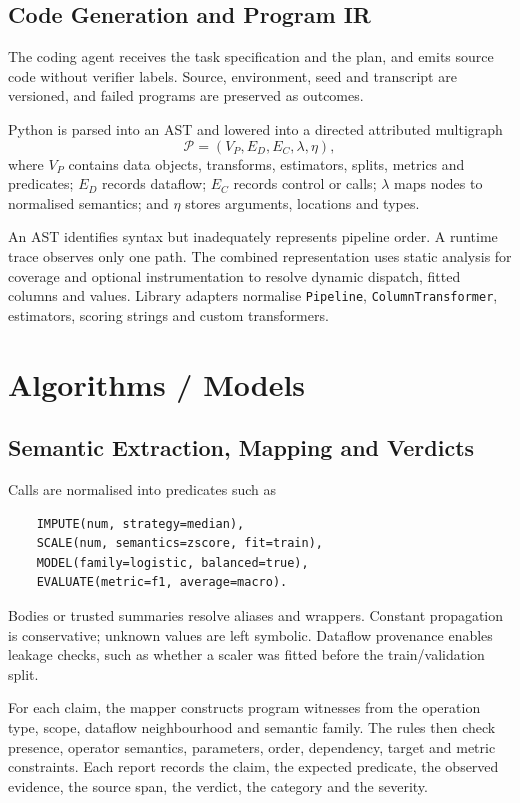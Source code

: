 \subsection{Code Generation and Program IR}

The coding agent receives the task specification and the plan, and
emits source code without verifier labels. Source, environment, seed
and transcript are versioned, and failed programs are preserved as
outcomes.

Python is parsed into an AST and lowered into a directed attributed
multigraph
\[
\mathcal{P} = (V_P, E_D, E_C, \lambda, \eta),
\]
where $V_P$ contains data objects, transforms, estimators, splits,
metrics and predicates; $E_D$ records dataflow; $E_C$ records
control or calls; $\lambda$ maps nodes to normalised semantics; and
$\eta$ stores arguments, locations and types.

An AST identifies syntax but inadequately represents pipeline order.
A runtime trace observes only one path. The combined representation
uses static analysis for coverage and optional instrumentation to
resolve dynamic dispatch, fitted columns and values. Library
adapters normalise \texttt{Pipeline},
\texttt{ColumnTransformer}, estimators, scoring strings and custom
transformers.

\section{Algorithms / Models}

\subsection{Semantic Extraction, Mapping and Verdicts}

Calls are normalised into predicates such as
\begin{verbatim}
    IMPUTE(num, strategy=median),
    SCALE(num, semantics=zscore, fit=train),
    MODEL(family=logistic, balanced=true),
    EVALUATE(metric=f1, average=macro).
\end{verbatim}
Bodies or trusted summaries resolve aliases and wrappers. Constant
propagation is conservative; unknown values are left symbolic.
Dataflow provenance enables leakage checks, such as whether a
scaler was fitted before the train/validation split.

For each claim, the mapper constructs program witnesses from the
operation type, scope, dataflow neighbourhood and semantic family.
The rules then check presence, operator semantics, parameters, order,
dependency, target and metric constraints. Each report records the
claim, the expected predicate, the observed evidence, the source span,
the verdict, the category and the severity.

